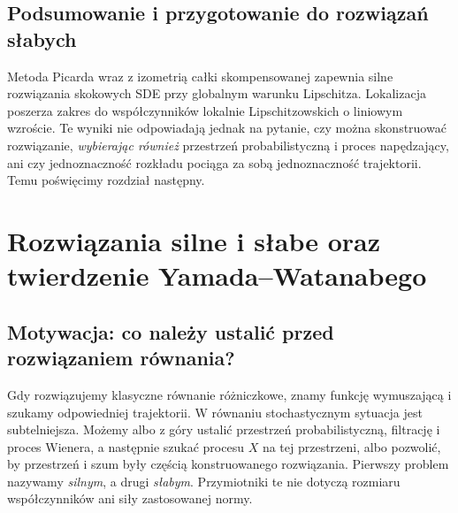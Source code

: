 \documentclass[11pt,a4paper,oneside]{report}
\numberwithin{equation}{chapter}
\theoremstyle{plain}
\theoremstyle{definition}
\theoremstyle{remark}
\begin{document}
\section{Podsumowanie i przygotowanie do rozwiązań słabych}\label{sec:volIII:13:08}
Metoda Picarda wraz z izometrią całki skompensowanej
zapewnia silne rozwiązania skokowych SDE przy globalnym
warunku Lipschitza. Lokalizacja poszerza zakres do
współczynników lokalnie Lipschitzowskich o liniowym
wzroście. Te wyniki nie odpowiadają jednak na pytanie,
czy można skonstruować rozwiązanie, \emph{wybierając również}
przestrzeń probabilistyczną i proces napędzający, ani czy
jednoznaczność rozkładu pociąga za sobą jednoznaczność
trajektorii. Temu poświęcimy rozdział następny.

\chapter{Rozwiązania silne i słabe oraz twierdzenie Yamada--Watanabego}
\label{chap:volIII:14}
\par\smallskip{}\par\smallskip

\label{ch:weak-strong-sde}

\section{Motywacja: co należy ustalić przed rozwiązaniem równania?}\label{sec:volIII:14:01}

Gdy rozwiązujemy klasyczne równanie różniczkowe, znamy funkcję
wymuszającą i szukamy odpowiedniej trajektorii. W równaniu
stochastycznym sytuacja jest subtelniejsza. Możemy albo z góry
ustalić przestrzeń probabilistyczną, filtrację i proces Wienera,
a następnie szukać procesu $X$ na tej przestrzeni, albo
pozwolić, by przestrzeń i szum były częścią konstruowanego
rozwiązania. Pierwszy problem nazywamy \emph{silnym}, a drugi
\emph{słabym}. Przymiotniki te nie dotyczą rozmiaru współczynników
ani siły zastosowanej normy.
\end{document}
